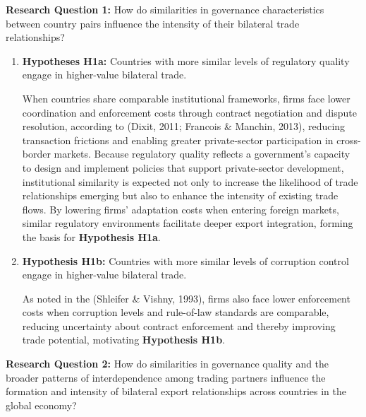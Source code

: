 \documentclass[
]{article}
\begin{document}
\textbf{Research Question 1:} How do similarities in governance
characteristics between country pairs influence the intensity of their
bilateral trade relationships?

\begin{enumerate}
\def\labelenumi{\arabic{enumi}.}
\item
  \textbf{Hypotheses H1a:} Countries with more similar levels of
  regulatory quality engage in higher-value bilateral trade.

  When countries share comparable institutional frameworks, firms face
  lower coordination and enforcement costs through contract negotiation
  and dispute resolution, according to (Dixit, 2011; Francois \&
  Manchin, 2013), reducing transaction frictions and enabling greater
  private-sector participation in cross-border markets. Because
  regulatory quality reflects a government's capacity to design and
  implement policies that support private-sector development,
  institutional similarity is expected not only to increase the
  likelihood of trade relationships emerging but also to enhance the
  intensity of existing trade flows. By lowering firms' adaptation costs
  when entering foreign markets, similar regulatory environments
  facilitate deeper export integration, forming the basis for
  \textbf{Hypothesis H1a}.
\item
  \textbf{Hypothesis H1b:} Countries with more similar levels of
  corruption control engage in higher-value bilateral trade.

  As noted in the (Shleifer \& Vishny, 1993), firms also face lower
  enforcement costs when corruption levels and rule-of-law standards are
  comparable, reducing uncertainty about contract enforcement and
  thereby improving trade potential, motivating \textbf{Hypothesis H1b}.
\end{enumerate}

\textbf{Research Question 2:} How do similarities in governance quality
and the broader patterns of interdependence among trading partners
influence the formation and intensity of bilateral export relationships
across countries in the global economy?
\end{document}
